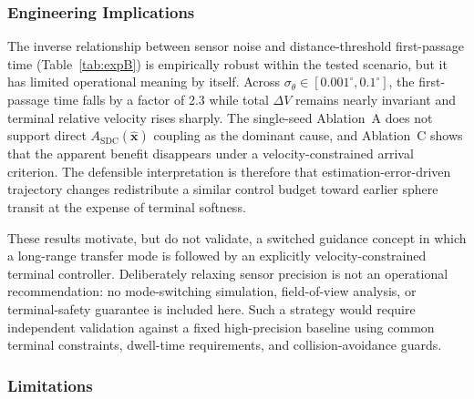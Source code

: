 \documentclass[preprint,3p,times]{elsarticle}
\begin{document}
\subsubsection{Engineering Implications}

The inverse relationship between sensor noise and distance-threshold first-passage time (Table~\ref{tab:expB}) is empirically robust within the tested scenario, but it has limited operational meaning by itself. Across $\sigma_\theta \in [0.001^\circ, 0.1^\circ]$, the first-passage time falls by a factor of 2.3 while total $\Delta V$ remains nearly invariant and terminal relative velocity rises sharply. The single-seed Ablation~A does not support direct $A_{\text{SDC}}(\hat{\mathbf{x}})$ coupling as the dominant cause, and Ablation~C shows that the apparent benefit disappears under a velocity-constrained arrival criterion. The defensible interpretation is therefore that estimation-error-driven trajectory changes redistribute a similar control budget toward earlier sphere transit at the expense of terminal softness.

These results motivate, but do not validate, a switched guidance concept in which a long-range transfer mode is followed by an explicitly velocity-constrained terminal controller. Deliberately relaxing sensor precision is not an operational recommendation: no mode-switching simulation, field-of-view analysis, or terminal-safety guarantee is included here. Such a strategy would require independent validation against a fixed high-precision baseline using common terminal constraints, dwell-time requirements, and collision-avoidance guards.

\subsubsection{Limitations}
\end{document}
